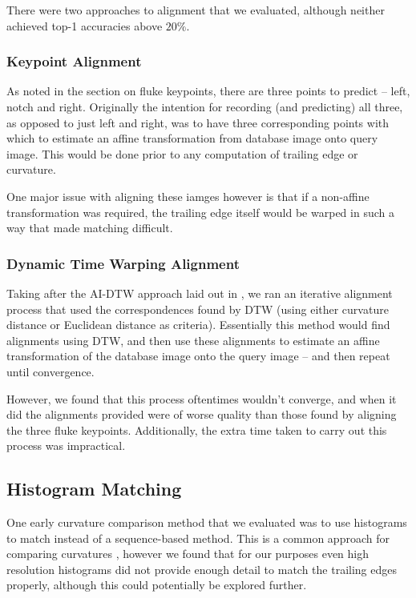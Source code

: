 There were two approaches to alignment that we evaluated, although neither achieved top-1 accuracies above $20\%$.

\subsubsection{Keypoint Alignment}

As noted in the section on fluke keypoints, there are three points to predict -- left, notch and right.
Originally the intention for recording (and predicting) all three, as opposed to just left and right, was to have three corresponding points with which to estimate an affine transformation from database image onto query image.
This would be done prior to any computation of trailing edge or curvature.

One major issue with aligning these iamges however is that if a non-affine transformation was required, the trailing edge itself would be warped in such a way that made matching difficult.

\subsubsection{Dynamic Time Warping Alignment}

Taking after the AI-DTW approach laid out in \cite{qiao2006affine}, we ran an iterative alignment process that used the correspondences found by DTW (using either curvature distance or Euclidean distance as criteria).
Essentially this method would find alignments using DTW, and then use these alignments to estimate an affine transformation of the database image onto the query image -- and then repeat until convergence.

However, we found that this process oftentimes wouldn't converge, and when it did the alignments provided were of worse quality than those found by aligning the three fluke keypoints.
Additionally, the extra time taken to carry out this process was impractical.

\subsection{Histogram Matching}

One early curvature comparison method that we evaluated was to use histograms to match instead of a sequence-based method.
This is a common approach for comparing curvatures \cite{kumar2012leafsnap}, however we found that for our purposes even high resolution histograms did not provide enough detail to match the trailing edges properly, although this could potentially be explored further.


